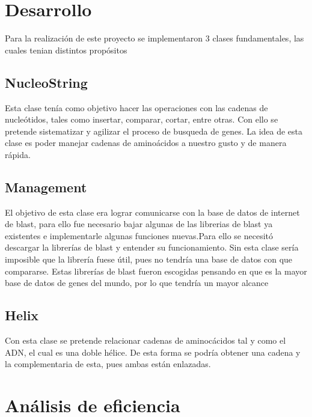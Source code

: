 \documentclass[10pt,a4paper,spanish] {article}
\begin{document}
\section{Desarrollo}
Para la realización de este proyecto se implementaron 3 clases fundamentales, las cuales tenian distintos propósitos 


\subsection{NucleoString}
	Esta clase tenía como objetivo hacer las operaciones con las cadenas de nucleótidos, tales como insertar, comparar, cortar, entre otras. 
	Con ello se pretende sistematizar y agilizar el proceso de busqueda de genes. La idea de esta clase es poder manejar cadenas de aminoácidos a nuestro gusto y de manera rápida.
	
\subsection{Management}
	El objetivo de esta clase era lograr comunicarse con la base de datos de internet de blast, para ello fue necesario bajar algunas de las librerias de blast ya existentes e implementarle algunas funciones nuevas.Para ello se necesitó descargar la librerías de blast y entender su funcionamiento. Sin esta clase sería imposible que la librería fuese útil, pues no tendría una base de datos con que compararse. Estas librerías de blast fueron escogidas pensando en que es la mayor base de datos de genes del mundo, por lo que tendría un mayor alcance
	
\subsection{Helix}
	Con esta clase se pretende relacionar cadenas de aminocácidos tal y como el ADN, el cual es una doble hélice. De esta forma se podría obtener una cadena y la complementaria de esta, pues ambas están enlazadas. 

\section{Análisis de eficiencia}
\end{document}
